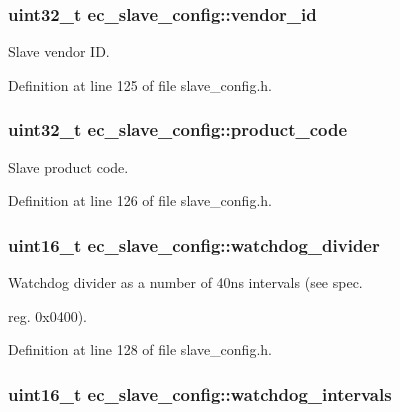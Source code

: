 \subsubsection[{vendor\-\_\-id}]{\setlength{\rightskip}{0pt plus 5cm}uint32\-\_\-t {\bf ec\-\_\-slave\-\_\-config\-::vendor\-\_\-id}}\label{structec__slave__config_ad561239255f4392e34fb12e0327063e0}


\-Slave vendor \-I\-D. 



\-Definition at line 125 of file slave\-\_\-config.\-h.

\subsubsection[{product\-\_\-code}]{\setlength{\rightskip}{0pt plus 5cm}uint32\-\_\-t {\bf ec\-\_\-slave\-\_\-config\-::product\-\_\-code}}\label{structec__slave__config_a11dfa0af49e66d7b44f2b78d122e1040}


\-Slave product code. 



\-Definition at line 126 of file slave\-\_\-config.\-h.

\subsubsection[{watchdog\-\_\-divider}]{\setlength{\rightskip}{0pt plus 5cm}uint16\-\_\-t {\bf ec\-\_\-slave\-\_\-config\-::watchdog\-\_\-divider}}\label{structec__slave__config_aaa1db6b3136fa60412cbf8d1302c48e9}


\-Watchdog divider as a number of 40ns intervals (see spec. 

reg. 0x0400). 

\-Definition at line 128 of file slave\-\_\-config.\-h.

\subsubsection[{watchdog\-\_\-intervals}]{\setlength{\rightskip}{0pt plus 5cm}uint16\-\_\-t {\bf ec\-\_\-slave\-\_\-config\-::watchdog\-\_\-intervals}}\label{structec__slave__config_a51e0bd197191abd7a46fd3206575eccb}


